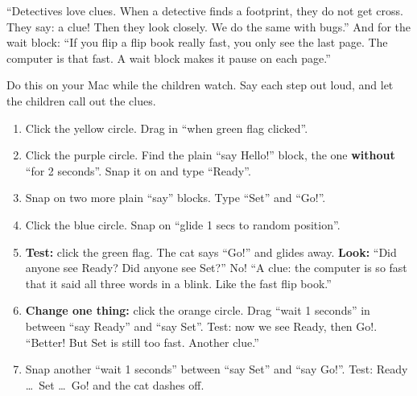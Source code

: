 \begin{analogy}
\enquote{Detectives love clues. When a detective finds a footprint, they do not get cross. They say: a clue! Then they look closely. We do the same with bugs.} And for the wait block: \enquote{If you flip a flip book really fast, you only see the last page. The computer is that fast. A wait block makes it pause on each page.}
\end{analogy}

\begin{workedexample}
Do this on your Mac while the children watch. Say each step out loud, and let the children call out the clues.
\begin{enumerate}[leftmargin=1.4em,itemsep=1pt]
  \item Click the yellow  circle. Drag in \enquote{when green flag clicked}.
  \item Click the purple  circle. Find the plain \enquote{say Hello!} block, the one \textbf{without} \enquote{for 2 seconds}. Snap it on and type \enquote{Ready}.
  \item Snap on two more plain \enquote{say} blocks. Type \enquote{Set} and \enquote{Go!}.
  \item Click the blue  circle. Snap on \enquote{glide 1 secs to random position}.
  \item \textbf{Test:} click the green flag. The cat says \enquote{Go!} and glides away. \textbf{Look:} \enquote{Did anyone see Ready? Did anyone see Set?} No! \enquote{A clue: the computer is so fast that it said all three words in a blink. Like the fast flip book.}
  \item \textbf{Change one thing:} click the orange  circle. Drag \enquote{wait 1 seconds} in between \enquote{say Ready} and \enquote{say Set}. Test: now we see Ready, then Go!. \enquote{Better! But Set is still too fast. Another clue.}
  \item Snap another \enquote{wait 1 seconds} between \enquote{say Set} and \enquote{say Go!}. Test: Ready \ldots\ Set \ldots\ Go! and the cat dashes off.
\end{enumerate}
\begin{center}
\begin{scratch}[scale=0.85]
\end{scratch}
\end{center}
\end{workedexample}

